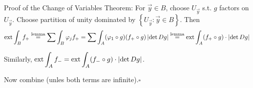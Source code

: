 \documentclass[10pt,letterpaper]{article}
\newcommand{\n}{\hfill\break}
\newcommand{\proven}{\;$\square$\n}
\newcommand{\ptxt}[1]{\textrm{\textnormal{#1}}}
\newcommand{\set}[1]{\left\{#1\right\}}
\newcommand{\abs}[1]{\left|#1\right|}
\newcommand{\of}{\circ}
\newcommand{\extint}{\ptxt{ext}\int}
\newcommand{\st}{s.t.}
\begin{document}
\par\noindent Proof of the Change of Variables Theorem: For $\vec{y}\in{}B$, choose $U_{\vec{y}}$ \st{} $g$ factors on $U_{\vec{y}}$. Choose partition of unity dominated by $\set{U_{\vec{y}}:\vec{y}\in{}B}$. Then
\[
\extint_{B}f_{+}\overset{\ptxt{lemma}}{=}\sum\int_{B}\varphi_{j}f_{+}=\sum\int_{A}(\varphi_{1}\of{}g)(f_{+}\of{}g)\abs{\det{}Dg}\overset{\ptxt{lemma}}{=}\extint_{A}(f_{+}\of{}g)\cdot\abs{\det{}Dg}
\]

\par\noindent Similarly, $\displaystyle\extint_{A}f_{-}=\extint_{A}(f_{-}\of{}g)\cdot\abs{\det{}Dg}$.\n

\par\noindent Now combine (unles both terms are infinite).\proven
\end{document}
